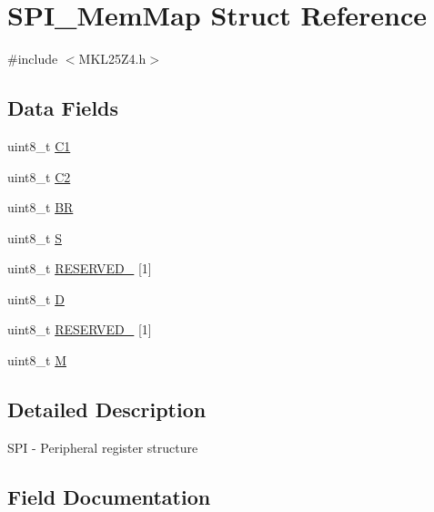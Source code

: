 \hypertarget{struct_s_p_i___mem_map}{}\section{S\+P\+I\+\_\+\+Mem\+Map Struct Reference}
\label{struct_s_p_i___mem_map}


{\ttfamily \#include $<$M\+K\+L25\+Z4.\+h$>$}

\subsection*{Data Fields}
\begin{DoxyCompactItemize}
\item 
uint8\+\_\+t \hyperlink{struct_s_p_i___mem_map_a8286c9d870f31a089d95e6a2285fbe2f}{C1}
\item 
uint8\+\_\+t \hyperlink{struct_s_p_i___mem_map_acdf8ac8ab339152eaed13f4eca300aa5}{C2}
\item 
uint8\+\_\+t \hyperlink{struct_s_p_i___mem_map_a48949110e9f7763216965bf0eef8dec2}{BR}
\item 
uint8\+\_\+t \hyperlink{struct_s_p_i___mem_map_aef44b210af6af7cb40efdfd5469406c0}{S}
\item 
uint8\+\_\+t \hyperlink{struct_s_p_i___mem_map_a4be6979b69000068ac5203085d425825}{R\+E\+S\+E\+R\+V\+E\+D\+\_} \mbox{[}1\mbox{]}
\item 
uint8\+\_\+t \hyperlink{struct_s_p_i___mem_map_a42ede28e876dcdb2ce2ddd730de0401e}{D}
\item 
uint8\+\_\+t \hyperlink{struct_s_p_i___mem_map_a83b2d6f5756a9b0aa609216190380d5f}{R\+E\+S\+E\+R\+V\+E\+D\+\_} \mbox{[}1\mbox{]}
\item 
uint8\+\_\+t \hyperlink{struct_s_p_i___mem_map_ae2c8107d00d3c9942e7a20fc598edecf}{M}
\end{DoxyCompactItemize}


\subsection{Detailed Description}
S\+PI -\/ Peripheral register structure 

\subsection{Field Documentation}
\mbox{\label{struct_s_p_i___mem_map_a48949110e9f7763216965bf0eef8dec2}} 
